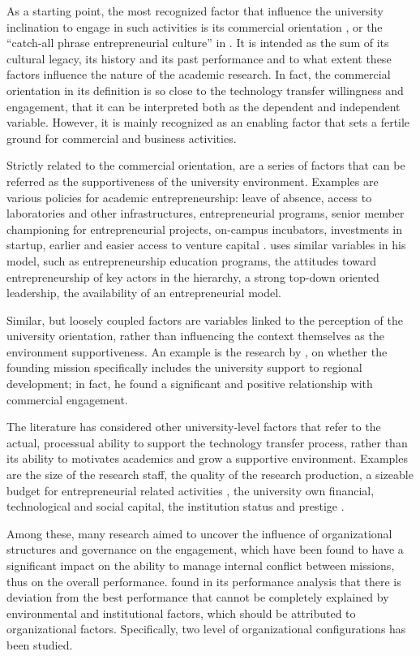 As a starting point, the most recognized factor that influence the university inclination to engage in such activities is its commercial orientation \citep{DEste2007}, or the \enquote{catch-all phrase entrepreneurial culture} in \citet{OwenSmith2001}. It is intended as the sum of its cultural legacy, its history and its past performance and to what extent these factors influence the nature of the academic research. In fact, the commercial orientation in its definition is so close to the technology transfer willingness and engagement, that it can be interpreted both as the dependent and independent variable. However, it is mainly recognized as an enabling factor that sets a fertile ground for commercial and business activities. 

Strictly related to the commercial orientation, are a series of factors that can be referred as the supportiveness of the university environment. Examples are various policies for academic entrepreneurship: leave of absence, access to laboratories and other infrastructures, entrepreneurial programs, senior member championing for entrepreneurial projects, on-campus incubators, investments in startup, earlier and easier access to venture capital \citep{Baldini2007}. \citet{Guerrero2014} uses similar variables in his model, such as entrepreneurship education programs, the attitudes toward entrepreneurship of key actors in the hierarchy, a strong top-down oriented leadership, the availability of an entrepreneurial model.

Similar, but loosely coupled factors are variables linked to the perception of the university orientation, rather than influencing the context themselves as the environment supportiveness. An example is the research by \citet{DEste2007}, on whether the founding mission specifically includes the university support to regional development; in fact, he found a significant and positive relationship with commercial engagement.

The literature has considered other university-level factors that refer to the actual, processual ability to support the technology transfer process, rather than its ability to motivates academics and grow a supportive environment. Examples are the size of the research staff, the quality of the research production, a sizeable budget for entrepreneurial related activities \citep{Colombo2010}, the university own financial, technological and social capital, the institution status and prestige \citep{Guerrero2014}.

Among these, many research aimed to uncover the influence of organizational structures and governance on the engagement, which have been found to have a significant impact on the ability to manage internal conflict between missions, thus on the overall performance. \citet{Siegel2003a} found in its performance analysis that there is deviation from the best performance that cannot be completely explained by environmental and institutional factors, which should be attributed to organizational factors. Specifically, two level of organizational configurations has been studied.

